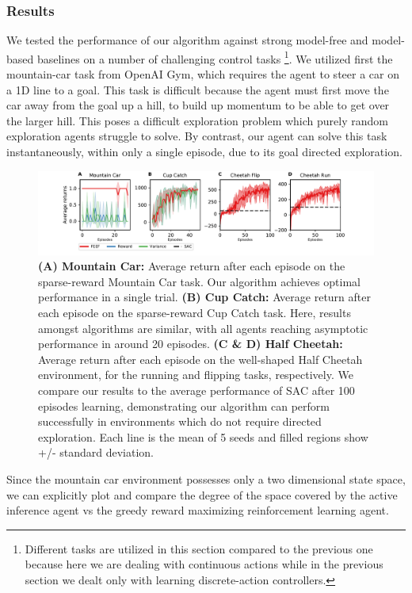 \subsubsection{Results}

We tested the performance of our algorithm against strong model-free and model-based baselines on a number of challenging control tasks \footnote{Different tasks are utilized in this section compared to the previous one because here we are dealing with continuous actions while in the previous section we dealt only with learning discrete-action controllers.}. We utilized first the mountain-car task from OpenAI Gym, which requires the agent to steer a car on a 1D line to a goal. This task is difficult because the agent must first move the car away from the goal up a hill, to build up momentum to be able to get over the larger hill. This poses a difficult exploration problem which purely random exploration agents struggle to solve. By contrast, our agent can solve this task instantaneously, within only a single episode, due to its goal directed exploration.

\begin{figure}[h]
   \centering 
      \includegraphics[width=15cm]{chapter_4_figures/RLAI_performance.pdf}
      \caption{\textbf{(A) Mountain Car:} Average return after each episode on the sparse-reward Mountain Car task. Our algorithm achieves optimal performance in a single trial. \textbf{(B) Cup Catch:} Average return after each episode on the sparse-reward Cup Catch task. Here, results amongst algorithms are similar, with all agents reaching asymptotic performance in around 20 episodes. \textbf{(C \& D) Half Cheetah:} Average return after each episode on the well-shaped Half Cheetah environment, for the running and flipping tasks, respectively. We compare our results to the average performance of SAC after 100 episodes learning, demonstrating our algorithm can perform successfully in environments which do not require directed exploration. Each line is the mean of 5 seeds and filled regions show +/- standard deviation.}
   \end{figure}

Since the mountain car environment possesses only a two dimensional state space, we can explicitly plot and compare the degree of the space covered by the active inference agent vs the greedy reward maximizing reinforcement learning agent.

